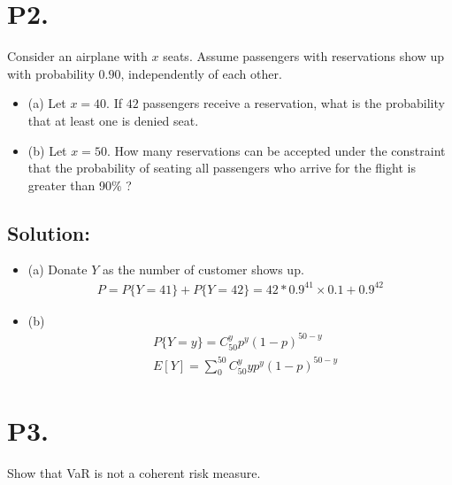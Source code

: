\documentclass{article}
\theoremstyle{definition}
\theoremstyle{definition}
\theoremstyle{remark}
\begin{document}
\section*{P2.}
Consider an airplane with $x$ seats. Assume passengers with reservations
show up with probability $0.90$, independently of each other.
\begin{itemize}
    \item (a) Let $x = 40$. If $42$ passengers receive a reservation, what is the
    probability that at least one is denied seat.
    \item (b) Let $x = 50$. How many reservations can be accepted under the
    constraint that the probability of seating all passengers who arrive
    for the flight is greater than 90$\%$ ?
\end{itemize} 

\subsection*{Solution:}
\begin{itemize}
	\item (a) Donate $Y$ as the number of customer shows up.
    \begin{equation*}
        \begin{aligned}
            P=P\{Y=41\}+P\{Y=42\}=42*0.9^{41} \times 0.1 +0.9^{42}
        \end{aligned}
    \end{equation*}
	\item (b)
    \begin{equation*}
        \begin{aligned}
            &P\{Y=y\} = C_{50}^y p^y(1-p)^{50-y} \\
            &E[Y] = \sum_0^{50} C_{50}^y yp^y(1-p)^{50-y}
        \end{aligned}
    \end{equation*}	
\end{itemize}


\section*{P3.}
Show that VaR is not a coherent risk measure.
\end{document}
